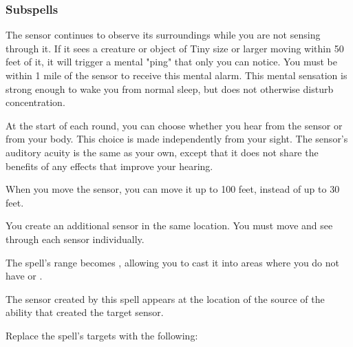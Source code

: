 \subsubsection{Subspells}



The sensor continues to observe its surroundings while you are not sensing through it.
If it sees a creature or object of Tiny size or larger moving within 50 feet of it, it will trigger a mental "ping" that only you can notice.
You must be within 1 mile of the sensor to receive this mental alarm.
This mental sensation is strong enough to wake you from normal sleep, but does not otherwise disturb concentration.







At the start of each round, you can choose whether you hear from the sensor or from your body.
This choice is made independently from your sight.
The sensor's auditory acuity is the same as your own, except that it does not share the benefits of any  effects that improve your hearing.







When you move the sensor, you can move it up to 100 feet, instead of up to 30 feet.







You create an additional sensor in the same location.
You must move and see through each sensor individually.







The spell's range becomes \rngunrestricted, allowing you to cast it into areas where you do not have  or .







The sensor created by this spell appears at the location of the source of the ability that created the target sensor.



Replace the spell's targets with the following:
\begin{spellcontent}

\begin{augmenttargetinginfo}




\end{augmenttargetinginfo}

\end{spellcontent}





